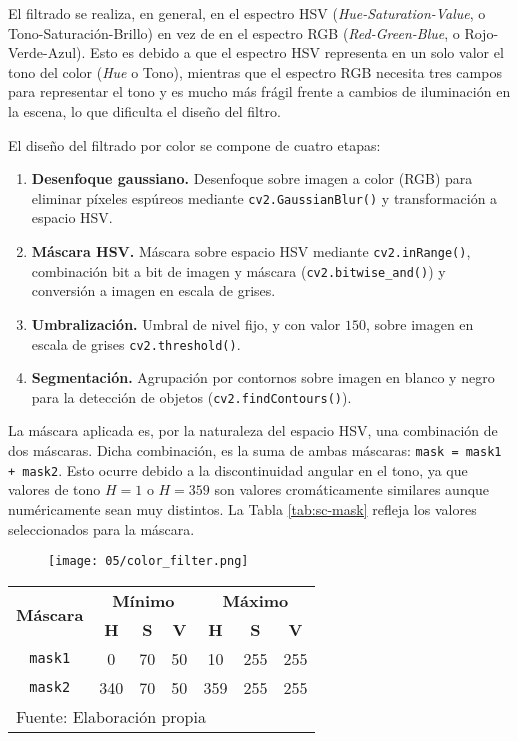\documentclass[../main.tex]{subfiles}
\begin{document}
El filtrado se realiza, en general, en el espectro HSV (\emph{Hue-Saturation-Value}, o Tono-Saturación-Brillo) en vez de en el espectro RGB (\emph{Red-Green-Blue}, o Rojo-Verde-Azul). Esto es debido a que el espectro HSV representa en un solo valor el tono del color (\emph{Hue} o Tono), mientras que el espectro RGB necesita tres campos para representar el tono y es mucho más frágil frente a cambios de iluminación en la escena, lo que dificulta el diseño del filtro.

El diseño del filtrado por color se compone de cuatro etapas:
\begin{enumerate}
    \item \textbf{Desenfoque gaussiano.} Desenfoque sobre imagen a color (RGB) para eliminar píxeles espúreos mediante \lstinline{cv2.GaussianBlur()} y transformación a espacio HSV.
    \item \textbf{Máscara HSV.} Máscara sobre espacio HSV mediante \lstinline{cv2.inRange()}, combinación bit a bit de imagen y máscara (\lstinline{cv2.bitwise_and()}) y conversión a imagen en escala de grises.
    \item \textbf{Umbralización.} Umbral de nivel fijo, y con valor $150$, sobre imagen en escala de grises \lstinline{cv2.threshold()}.
    \item \textbf{Segmentación.} Agrupación por contornos sobre imagen en blanco y negro para la detección de objetos (\lstinline{cv2.findContours()}).
\end{enumerate}

La máscara aplicada es, por la naturaleza del espacio HSV, una combinación de dos máscaras. Dicha combinación, es la suma de ambas máscaras: \lstinline{mask = mask1 + mask2}. Esto ocurre debido a la discontinuidad angular en el tono, ya que valores de tono $H=1$ o $H=359$ son valores cromáticamente similares aunque numéricamente sean muy distintos. La Tabla \ref{tab:sc-mask} refleja los valores seleccionados para la máscara.

\begin{figure}[!ht]
 	{\texttt{[image: 05/color\_filter.png]}}
\end{figure}

\begin{table}[H]
	{\begin{tabular}{|c|c|c|c|c|c|c|}
		\hline
		\multirow{2}{*}{\textbf{Máscara}} & \multicolumn{3}{c|}{\textbf{Mínimo}} & \multicolumn{3}{c|}{\textbf{Máximo}} \\
		\cline{2-7}
        & \textbf{H} & \textbf{S} & \textbf{V} & \textbf{H} & \textbf{S} & \textbf{V} \\
		\hline
		\lstinline{mask1} & 0 & 70 & 50 & 10 & 255 & 255 \\
        \hline
        \lstinline{mask2} & 340 & 70 & 50 & 359 & 255 & 255 \\
		\hline
		\multicolumn{7}{l}{Fuente: Elaboración propia}
	\end{tabular}}
\end{table}
\end{document}
